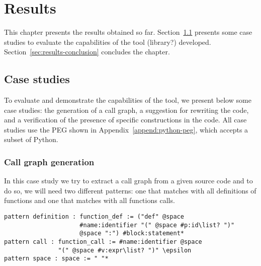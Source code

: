 \chapter{Results}\label{chap:results}

This chapter presents the results obtained so far. Section~\ref{sec:case-studies} 
presents some case studies to evaluate the capabilities of the tool (library?) developed.
Section~\ref{sec:results-conclusion} concludes the chapter.

\section{Case studies}\label{sec:case-studies}

To evaluate and demonstrate the capabilities of the tool, we present below
some case studies: the generation of a call graph, a suggestion for rewriting 
the code, and a verification of the presence of specific constructions in the 
code. All case studies use the PEG shown in Appendix~\ref{append:python-peg},
which accepts a subset of Python.

\subsection{Call graph generation}

In this case study we try to extract a call graph from a given source code
and to do so, we will need two different patterns: one that matches with all
definitions of functions and one that matches with all functions calls.

\begin{verbatim}
pattern definition : function_def := ("def" @space 
                     #name:identifier "(" @space #p:id\list? ")" 
                     @space ":") #block:statement*
pattern call : function_call := #name:identifier @space 
               "(" @space #v:expr\list? ")" \epsilon
pattern space : space := " "*
\end{verbatim}

